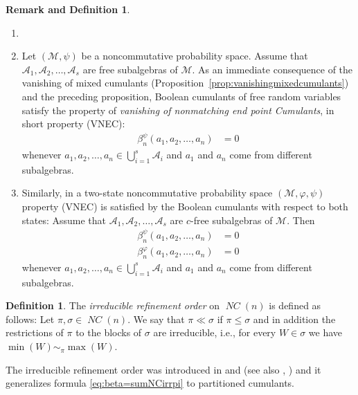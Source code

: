 \documentclass[12pt]{amsart}
\newcommand{\VNEC}{VNEC}
\DeclareMathOperator{\NC}{\mathit{NC}} %
\newcommand{\alg}[1]{\mathcal{#1}}
\theoremstyle{definition}
\newtheorem{definition}[theorem]{Definition}
\newtheorem{remdef}[theorem]{Remark and Definition}
\numberwithin{equation}{section}
\begin{document}
\begin{remdef}
  \label{remdef:fNEC}
  \begin{enumerate}[label=(\roman*)]
   \item []
    
   \item
    Let $(\alg{M},\psi)$ be a noncommutative probability space.
    Assume that $\alg{A}_1,\alg{A}_2,\ldots,\alg{A}_s$ are free subalgebras of $\alg{M}$.
    As an immediate consequence of the vanishing of mixed cumulants
    (Proposition~\ref{prop:vanishingmixedcumulants}) and the preceding
    proposition, Boolean cumulants of free random variables satisfy the
    property of \emph{vanishing of nonmatching end point Cumulants},
    in short property (\VNEC):
    \begin{align*}
      \beta_n^\psi(a_1,a_2,\dots,a_n) &= 0
    \end{align*}
    whenever $a_1,a_2,\dots,a_n\in\bigcup_{i=1}^s\alg{A}_i$ and
    $a_1$ and $a_n$ come from different subalgebras.
   \item
    Similarly, in a two-state noncommutative probability space
    $(\alg{M},\varphi,\psi)$ 
      property (\VNEC) is satisfied
    by the Boolean cumulants with respect to both states:
    Assume
    that $\alg{A}_1,\alg{A}_2,\ldots,\alg{A}_s$ are $c$-free subalgebras of $\alg{M}$. 
    Then
    \begin{align*}
      \beta_n^\psi(a_1,a_2,\dots,a_n) &= 0\\
      \beta_n^\varphi(a_1,a_2,\dots,a_n) &= 0
    \end{align*}
    whenever $a_1,a_2,\dots,a_n\in\bigcup_{i=1}^s\alg{A}_i$ and
    $a_1$ and $a_n$ come from different subalgebras.
  \end{enumerate}
  
\end{remdef}


\begin{definition}
  \label{def:irrreford}
  The  \emph{irreducible refinement order} on $\NC(n)$ is defined as follows: Let $\pi,\sigma\in \NC(n)$. 
  We say that $\pi\ll\sigma$ if $\pi\leq\sigma$ and in addition the restrictions of $\pi$ to the blocks of
  $\sigma$ are irreducible, i.e., for every $W\in\sigma$ we have $\min(W)\sim_\pi \max(W)$.
\end{definition}

The irreducible refinement order was introduced in
\cite {BelinschiNicaBBPforKTuples}
and \cite {PetrulloSenato:2011:kerov} 
(see also \cite {Nica:2010:linked}, \cite {BianeJosuatVerges:2019:bruhat})
and it generalizes formula \eqref{eq:beta=sumNCirrpi} to partitioned
cumulants.
\end{document}
